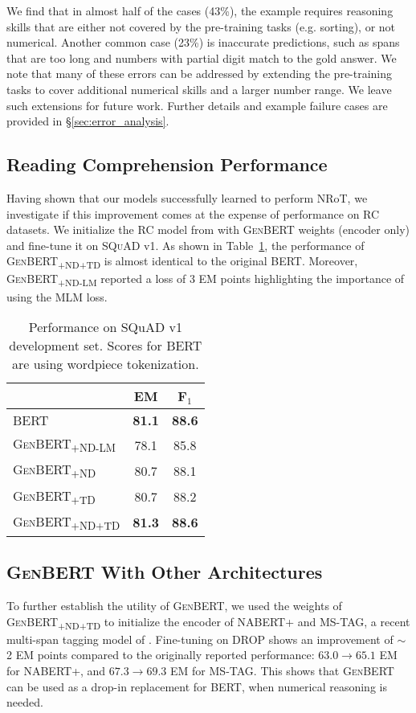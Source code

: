\documentclass[11pt,a4paper]{article}
\newcommand\ssc[1]{\textsubscript{\textsc{#1}}}
\newcommand\bert{\textsc{BERT}}
\newcommand\genbert{\textsc{GenBERT}}
\newcommand\nabert{\textsc{NABERT+}}
\newcommand\drop{\textsc{DROP}}
\newcommand\squad{\textsc{SQuAD}}
\begin{document}
We find that in almost half of the cases (43\%), the example requires reasoning skills that are either not covered by the pre-training tasks (e.g. sorting), or not numerical. 
Another common case (23\%) is inaccurate predictions, such as spans that are too long and numbers with partial digit match to the gold answer.
We note that many of these errors can be addressed by extending the pre-training tasks to cover additional numerical skills and a larger number range. We leave such extensions for future work.
Further details and example failure cases are provided in \S\ref{sec:error_analysis}.


\subsection{Reading Comprehension Performance}
Having shown that our models successfully learned to perform NRoT, we investigate if this improvement comes at the expense of performance on RC datasets. We initialize the RC model from 
\citet{devlin2018bert} with \genbert{} weights (encoder only) and fine-tune it on \squad{} v1. As shown in
Table~\ref{table:squad_performance}, the performance of  \textsc{GenBERT\ssc{+ND+TD}} is almost identical to the original \bert{}. Moreover, \textsc{GenBERT\ssc{+ND-LM}} reported a loss of 3 EM points  highlighting the importance of using the MLM loss.




\begin{table}[t]\setlength{\belowcaptionskip}{-10pt}
    \footnotesize
    \centering
    \begin{tabular}{l|c|c|}
         & EM & F$_1$ \\ \hline
         \textsc{BERT} & \bf 81.1 & \bf 88.6 \\
\textsc{GenBERT\ssc{+ND-LM}} & 78.1 & 85.8 \\
\textsc{GenBERT\ssc{+ND}} & 80.7 & 88.1 \\
         \textsc{GenBERT\ssc{+TD}} & 80.7 & 88.2 \\
         \textsc{GenBERT\ssc{+ND+TD}} & \bf 81.3 & \bf 88.6
    \end{tabular}
    \caption{Performance on SQuAD v1 development set. Scores for \textsc{BERT} are using wordpiece tokenization.
    }
    \label{table:squad_performance}
\end{table}

\subsection{\genbert{} With Other Architectures} 
To further establish the utility of \genbert{}, we used the weights of \textsc{GenBERT\ssc{+ND+TD}} to initialize the encoder of \nabert{} and \textsc{MS-TAG}, a recent multi-span tagging model of \citet{efrat2019tag}. 
Fine-tuning on \drop{} 
shows an improvement of $\sim$2 EM points compared to the originally reported performance: $63.0 \rightarrow 65.1$ EM for \nabert{}, and $67.3 \rightarrow 69.3$ EM for \textsc{MS-TAG}. This shows that \genbert{} can be used as a drop-in replacement for \bert{}, when numerical reasoning is needed.
\end{document}
